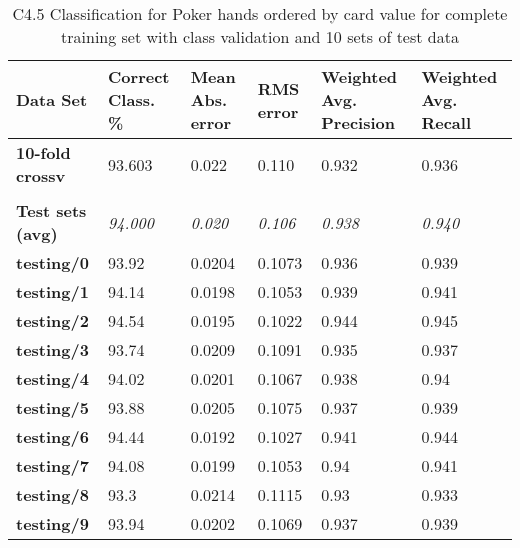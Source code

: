 \documentclass[10pt, a4paper]{article}
\begin{document}
\begin{table}[htbp]
  \centering
  \begin{tabular}{p{3cm}p{1.5cm}p{1.5cm}p{1.5cm}p{1.5cm}p{1.5cm}}
    \toprule
    \textbf{Data Set} & Correct Class. \% & Mean Abs. error & RMS error & Weighted Avg. Precision & Weighted Avg. Recall \\
    \midrule
    \textbf{10-fold crossv} & 93.603 & 0.022 & 0.110 & 0.932 & 0.936 \\
    \textbf{} &       &       &       &       &  \\
    \textbf{Test sets (avg)} & \textit{94.000} & \textit{0.020} & \textit{0.106} & \textit{0.938} & \textit{0.940} \\
    \textbf{   testing/0} & 93.92 & 0.0204 & 0.1073 & 0.936 & 0.939 \\
    \textbf{   testing/1} & 94.14 & 0.0198 & 0.1053 & 0.939 & 0.941 \\
    \textbf{   testing/2} & 94.54 & 0.0195 & 0.1022 & 0.944 & 0.945 \\
    \textbf{   testing/3} & 93.74 & 0.0209 & 0.1091 & 0.935 & 0.937 \\
    \textbf{   testing/4} & 94.02 & 0.0201 & 0.1067 & 0.938 & 0.94 \\
    \textbf{   testing/5} & 93.88 & 0.0205 & 0.1075 & 0.937 & 0.939 \\
    \textbf{   testing/6} & 94.44 & 0.0192 & 0.1027 & 0.941 & 0.944 \\
    \textbf{   testing/7} & 94.08 & 0.0199 & 0.1053 & 0.94  & 0.941 \\
    \textbf{   testing/8} & 93.3  & 0.0214 & 0.1115 & 0.93  & 0.933 \\
    \textbf{   testing/9} & 93.94 & 0.0202 & 0.1069 & 0.937 & 0.939 \\
    \bottomrule
    \end{tabular}%

\caption{C4.5 Classification for Poker hands ordered by card value for complete training set with class validation and 10 sets of test data}   
  \label{tab:dtocresults}%
\end{table}%
\end{document}
